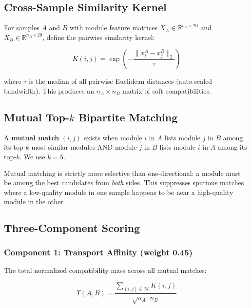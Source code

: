 \documentclass{../yalumba}
\begin{document}
\subsection{Cross-Sample Similarity Kernel}

For samples $A$ and $B$ with module feature matrices $X_A \in \mathbb{R}^{n_A
\times 20}$ and $X_B \in \mathbb{R}^{n_B \times 20}$, define the pairwise
similarity kernel:

\begin{equation}
  K(i, j) = \exp\!\left(-\frac{\|x_i^A - x_j^B\|_2}{\tau}\right)
  \label{eq:kernel}
\end{equation}

where $\tau$ is the median of all pairwise Euclidean distances (auto-scaled
bandwidth).  This produces an $n_A \times n_B$ matrix of soft
compatibilities.

\subsection{Mutual Top-$k$ Bipartite Matching}

\begin{definition}
A \textbf{mutual match} $(i, j)$ exists when module $i$ in $A$ lists module
$j$ in $B$ among its top-$k$ most similar modules AND module $j$ in $B$
lists module $i$ in $A$ among its top-$k$.  We use $k = 5$.
\end{definition}


Mutual matching is strictly more selective than one-directional: a module must
be among the best candidates from \emph{both} sides.  This suppresses
spurious matches where a low-quality module in one sample happens to be
near a high-quality module in the other.

\subsection{Three-Component Scoring}

\subsubsection{Component 1: Transport Affinity (weight 0.45)}

The total normalized compatibility mass across all mutual matches:

\begin{equation}
  T(A, B) = \frac{\sum_{(i,j) \in \mathcal{M}} K(i, j)}
                  {\sqrt{n_A \cdot n_B}}
  \label{eq:transport}
\end{equation}
\end{document}
